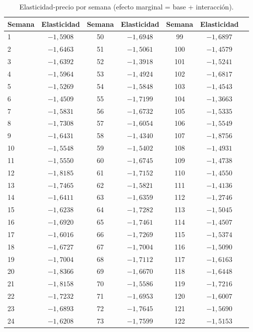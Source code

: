 \documentclass[doc, a4paper, biblatex, floatsintext, longtable, babel]{apa7}
\begin{document}
\begin{table}[!htbp]
\centering
\caption{Elasticidad-precio por semana (efecto marginal = base + interacción).}
\label{tab:fe_time_varying_elasticidad}
\footnotesize
\begin{tabular}{lcccccc}
\toprule
Semana & Elasticidad & Semana & Elasticidad & Semana & Elasticidad \\
\midrule
1 & $-1,5908$ & 50 & $-1,6948$ & 99 & $-1,6897$ \\
2 & $-1,6463$ & 51 & $-1,5061$ & 100 & $-1,4579$ \\
3 & $-1,6392$ & 52 & $-1,3918$ & 101 & $-1,5241$ \\
4 & $-1,5964$ & 53 & $-1,4924$ & 102 & $-1,6817$ \\
5 & $-1,5269$ & 54 & $-1,5848$ & 103 & $-1,4543$ \\
6 & $-1,4509$ & 55 & $-1,7199$ & 104 & $-1,3663$ \\
7 & $-1,5831$ & 56 & $-1,6732$ & 105 & $-1,5335$ \\
8 & $-1,7308$ & 57 & $-1,6054$ & 106 & $-1,5549$ \\
9 & $-1,6431$ & 58 & $-1,4340$ & 107 & $-1,8756$ \\
10 & $-1,5548$ & 59 & $-1,5402$ & 108 & $-1,4931$ \\
11 & $-1,5550$ & 60 & $-1,6745$ & 109 & $-1,4738$ \\
12 & $-1,8185$ & 61 & $-1,7152$ & 110 & $-1,4550$ \\
13 & $-1,7465$ & 62 & $-1,5821$ & 111 & $-1,4136$ \\
14 & $-1,6411$ & 63 & $-1,6359$ & 112 & $-1,2746$ \\
15 & $-1,6238$ & 64 & $-1,7282$ & 113 & $-1,5045$ \\
16 & $-1,6920$ & 65 & $-1,7461$ & 114 & $-1,4507$ \\
17 & $-1,6016$ & 66 & $-1,7269$ & 115 & $-1,5374$ \\
18 & $-1,6727$ & 67 & $-1,7004$ & 116 & $-1,5090$ \\
19 & $-1,7004$ & 68 & $-1,7112$ & 117 & $-1,6163$ \\
20 & $-1,8366$ & 69 & $-1,6670$ & 118 & $-1,6448$ \\
21 & $-1,8158$ & 70 & $-1,5586$ & 119 & $-1,7216$ \\
22 & $-1,7232$ & 71 & $-1,6953$ & 120 & $-1,6007$ \\
23 & $-1,6893$ & 72 & $-1,7645$ & 121 & $-1,5690$ \\
24 & $-1,6208$ & 73 & $-1,7599$ & 122 & $-1,5153$ \\

\end{tabular}
\end{table}
\end{document}
